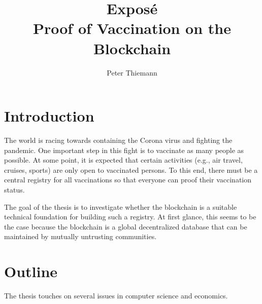 \documentclass{article}
\title{Expos\'{e}\\
  Proof of Vaccination on the Blockchain}
\author{Peter Thiemann}
\begin{document}
\maketitle

\section{Introduction}
\label{sec:introduction}

The world is racing towards containing the Corona virus and fighting the pandemic.
One important step in this fight is to vaccinate as many people as possible.
At some point, it is expected that certain activities (e.g., air travel, cruises, sports) are only open to vaccinated  persons. To this end, there must be a central registry for all vaccinations so that everyone can proof their vaccination status.

The goal of the thesis is to investigate whether the blockchain is a suitable technical foundation for building such a registry. At first glance, this seems to be the case because the blockchain is a global decentralized database that can be maintained by mutually untrusting communities.

\section{Outline}
\label{sec:outline}

The thesis touches on several issues in computer science and economics.
\end{document}
